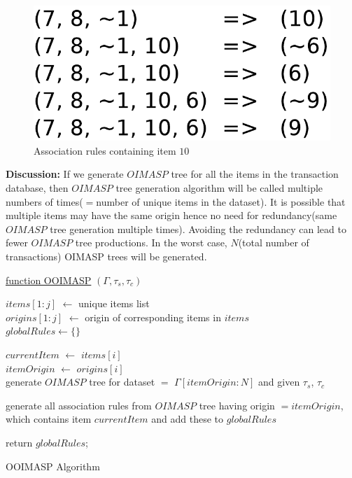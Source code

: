 \documentclass[3p, twocolumn]{elsarticle}
\begin{document}
\begin{figure}
\begin{center}
\includegraphics[scale=0.35]{pdf/arules10}
\end{center}
\caption{Association rules containing item $ 10 $}
\label{Fig 10}
\end{figure}

\textbf{Discussion:} If we generate $ OIMASP $ tree for all the items in the transaction database, then $ OIMASP $ tree generation algorithm will be called multiple numbers of times($ = $number of unique items in the dataset). It is possible that multiple items may have the same origin hence no need for redundancy(same $ OIMASP $ tree generation multiple times). Avoiding the redundancy can lead to fewer $ OIMASP $ tree productions. In the worst case, $ N $(total number of transactions) OIMASP trees will be generated.

\begin{algorithm}

    \underline{function OOIMASP} $ (\Gamma, \tau _{s}, \tau _{c}) $\;
       
    $ items[1:j] $ $ \leftarrow $ unique items list \\
    $ origins[1:j] $ $ \leftarrow $ origin of corresponding items in $ items $ \\       
    $ globalRules \leftarrow \lbrace \rbrace $
       
	  {
		$ currentItem $ $ \leftarrow $ $ items[i] $ \\
		$ itemOrigin $ $ \leftarrow $ $ origins[i] $ \\
			  	
      	  {
            generate $ OIMASP $ tree for dataset $ = $ $ \Gamma[itemOrigin:N] $ and given $ \tau _{s} $, $ 				\tau _{c} $
          }	
          
		generate all association rules from $ OIMASP $ tree having origin $ = itemOrigin $, which contains 			item $ currentItem $ and add these to $ globalRules $
	  }
	          		
	return $ globalRules $;      
    \caption{OOIMASP Algorithm}
\end{algorithm}
\end{document}
